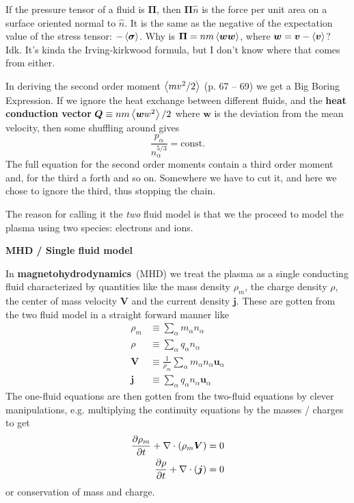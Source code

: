 \documentclass[10pt,landscape]{article}
\renewcommand{\vec}{\bm}
\newcommand{\topiccolor}{green}
\renewcommand{\section}[2]{%
	\renewcommand{\topiccolor}{#2}
	\begin{tcolorbox}[boxsep=0.5mm, left=1mm, right=1mm, top=0mm, bottom=0mm,
		colback=#2!30, colframe=#2, arc is angular]%
		\centering \textbf{#1}%
	\end{tcolorbox}%
	\nopagebreak%
}
\newcommand{\cbf}[1]{\textcolor{\topiccolor!80!black}{\textbf{#1}}}
\begin{document}
\begin{multicols*}{3}
\begin{tcolorbox}[title=An aside: wtf is a \textit{pressure tensor}?,
	colframe=\topiccolor!10!white, colback=white, coltitle=\topiccolor]
	If the pressure tensor of a fluid is $\vec \Pi$, then $\vec \Pi \hat n$ is
	the force per unit area on a surface oriented normal to $\hat n$.
	It is the same as the negative of the expectation value of the stress
	tensor: $-\expval{\vec \sigma}$.
	Why is $\vec \Pi = n m \expval{\vec w \vec w}$, where $\vec w = \vec v -
	\expval{\vec v}$? Idk. It's kinda the Irving-kirkwood formula, but I don't
	know where that comes from either.
\end{tcolorbox}

In deriving the second order moment $\left\langle mv^2/2\right\rangle$ (p. 67 -- 69) we get
a Big Boring Expression\texttrademark.
If we ignore the heat exchange between different fluids, and the
\cbf{heat conduction vector}
$\vec Q \equiv n m \expval{\vec w w^2} / 2$
where $\vec w$ is the deviation from the mean velocity,
then some shuffling around gives
\begin{equation}
	\label{eq:state}
	\frac{p_\alpha}{n_\alpha^{5/3}} = \text{const.}
\end{equation}
The full equation for the second order moments contain a third order moment and,
for the third a forth and so on.
Somewhere we have to cut it, and here we chose to ignore the third,
thus stopping the chain.

The reason for calling it the \emph{two} fluid model is that we the proceed
to model the plasma using two species: electrons and ions.

\section{MHD / Single fluid model}{lime}

In \cbf{magnetohydrodynamics} (MHD) we treat the plasma as a single conducting
fluid characterized by quantities like the mass density $\rho_m$, the charge
density $\rho$, the center of mass velocity $\vec V$ and the current density
$\vec j$.
These are gotten from the two fluid model in a straight forward manner like
\begin{align*}
	\rho_m &\equiv \sum_\alpha m_\alpha n_\alpha\\
	\rho &\equiv \sum_\alpha q_\alpha n_\alpha\\
	\vec V &\equiv \frac{1}{\rho_m} \sum_\alpha m_\alpha n_\alpha \vec u_\alpha\\
	\vec j &\equiv \sum_\alpha q_\alpha n_\alpha \vec u_\alpha
\end{align*}
The one-fluid equations are then gotten from the two-fluid equations by clever
manipulations, e.g. multiplying the continuity equations by the masses / charges
to get
\begin{align*}
	\diffp{\rho_m}{t} + \nabla \cdot (\rho_m \vec V) = 0\\
	\diffp{\rho}{t} + \nabla \cdot (\vec j) = 0
\end{align*}
or conservation of mass and charge.


\end{multicols*}
\end{document}
